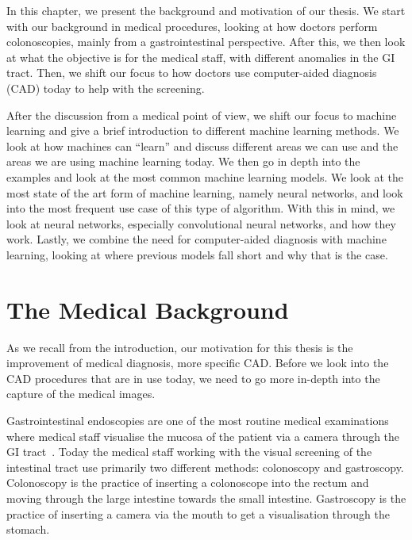 In this chapter, we present the background and motivation of our thesis.
We start with our background in medical procedures, looking at how doctors perform colonoscopies, mainly from a gastrointestinal perspective.
After this, we then look at what the objective is for the medical staff, with different anomalies in the GI tract. Then, we shift our focus to how doctors use computer-aided diagnosis (CAD) today to help with the screening. 

After the discussion from a medical point of view, we shift our focus to machine learning and give a brief introduction to different machine learning methods. We look at how machines can ``learn'' and discuss different areas we can use and the areas we are using machine learning today. We then go in depth into the examples and look at the most common machine learning models. We look at the most state of the art form of machine learning, namely neural networks, and look into the most frequent use case of this type of algorithm.
With this in mind, we look at neural networks, especially convolutional neural networks, and how they work.
Lastly, we combine the need for computer-aided diagnosis with machine learning, looking at where previous models fall short and why that is the case.

\section{The Medical Background}
\label{cha:endocolo}
As we recall from the introduction, our motivation for this thesis is the improvement of medical diagnosis, more specific CAD. 
Before we look into the CAD procedures that are in use today, we need to go more in-depth into the capture of the medical images. 

\vspace{5px}
Gastrointestinal endoscopies are one of the most routine medical examinations where medical staff visualise the mucosa of the patient via a camera through the GI tract~\cite{Holme13}.
Today the medical staff working with the visual screening of the intestinal tract use primarily two different methods: colonoscopy and gastroscopy. 
Colonoscopy is the practice of inserting a colonoscope into the rectum and moving through the large intestine towards the small intestine.  Gastroscopy is the practice of inserting a camera via the mouth to get a visualisation through the stomach.

